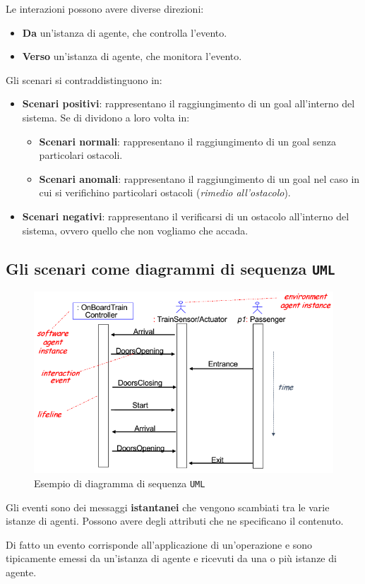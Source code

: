 Le interazioni possono avere diverse direzioni:
\begin{itemize}
    \item \textbf{Da} un'istanza di agente, che controlla l'evento.
    \item \textbf{Verso} un'istanza di agente, che monitora l'evento.
\end{itemize}
Gli scenari si contraddistinguono in:
\begin{itemize}
    \item \textbf{Scenari positivi}: rappresentano il raggiungimento di un goal 
    all'interno del sistema. Se di dividono a loro volta in:
    \begin{itemize}
        \item \textbf{Scenari normali}: rappresentano il raggiungimento di un goal
        senza particolari ostacoli.
        \item \textbf{Scenari anomali}: rappresentano il raggiungimento di un goal 
        nel caso in cui si verifichino particolari ostacoli (\textit{rimedio all'ostacolo}).
    \end{itemize}
    \item \textbf{Scenari negativi}: rappresentano il verificarsi di un ostacolo 
    all'interno del sistema, ovvero quello che non vogliamo che accada.
\end{itemize}
\subsection{Gli scenari come diagrammi di sequenza \texttt{UML}}
\begin{figure}[H]
    \centering
    \includegraphics[scale=0.5]{img/sequence-diagram.png}
    \caption{Esempio di diagramma di sequenza \texttt{UML}}
\end{figure}
\begin{tcolorbox}[colback=orange!5!white,colframe=orange!75!black, title=Eventi]
    Gli eventi sono dei messaggi \textbf{istantanei} che vengono scambiati tra le varie
    istanze di agenti. Possono avere degli attributi che ne specificano il contenuto.
\end{tcolorbox}
Di fatto un evento corrisponde all'applicazione di un'operazione e sono tipicamente 
emessi da un'istanza di agente e ricevuti da una o più istanze di agente.

